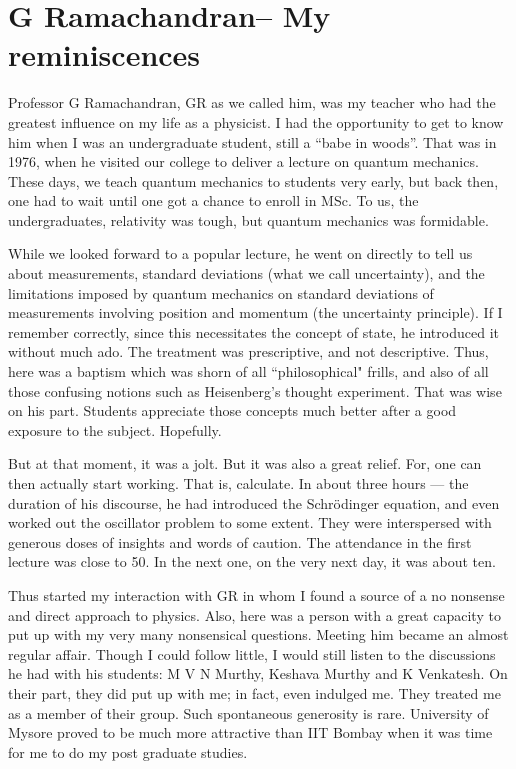 \chapter[G Ramachandran -- My reminiscences]{G Ramachandran\break -- My reminiscences}




Professor G Ramachandran, GR as we called him, was my teacher who had the greatest influence on my life as a physicist. I had the opportunity to get to know him when I was an undergraduate student, still a “babe in woods”. That was in 1976, when he visited our college to deliver a lecture on quantum mechanics. These days, we teach quantum mechanics to students very early, but back then, one had to wait until one got a chance to enroll in MSc. To us, the undergraduates, relativity was tough, but quantum mechanics was formidable.

While we looked forward to a popular lecture, he went on directly to tell us about measurements, standard deviations (what we call uncertainty), and the limitations imposed by quantum mechanics on standard deviations of measurements involving position and momentum (the uncertainty principle). If I remember correctly, since this necessitates the concept of state, he introduced it without much ado. The treatment was prescriptive, and not descriptive.  Thus, here was a baptism which was shorn of all ``philosophical" frills, and also of all those confusing notions such as Heisenberg's thought experiment. That was wise on his part. Students appreciate those concepts much better after a good exposure to the subject. Hopefully.

But at that moment, it was a jolt.  But it was also a great relief. For, one can then actually start working. That is, calculate. In about three hours --- the duration of his discourse, he had introduced the Schr\"{o}dinger equation, and even worked out the oscillator problem to some extent. They were interspersed with generous doses of insights and words of caution. The attendance in the first lecture was close to 50. In the next one, on the very next day, it was about ten.

Thus started my interaction with GR in whom I found a source of a no nonsense and direct approach to physics. Also, here was a person with a great capacity to put up with my very many nonsensical questions. Meeting him became an almost regular affair. Though I could follow little, I would still listen to the discussions he had with his students: M V N Murthy, Keshava Murthy and K Venkatesh. On their part, they did put up with me; in fact, even indulged me. They treated me as a member of their group. Such spontaneous generosity is rare. University of Mysore proved to be much more attractive than IIT Bombay when it was time for me to do my post graduate studies.

